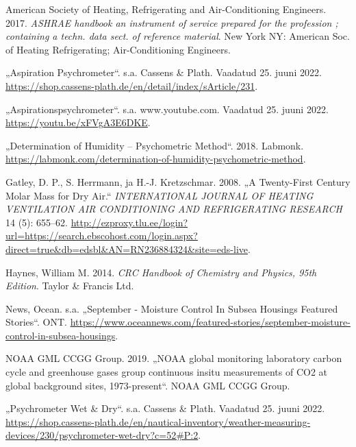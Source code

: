 \documentclass[
  12pt,
  a4paper,
  onecolumn, twoside]{article}
\newlength{\cslhangindent}
\newlength{\cslentryspacingunit} %
\newenvironment{CSLReferences}[2] %
 {%
  \setlength{\parindent}{0pt}
  \ifodd #1
  \let\oldpar\par
  \def\par{\hangindent=\cslhangindent\oldpar}
  \fi
  \setlength{\parskip}{#2\cslentryspacingunit}
 }%
 {}
\begin{document}
\hypertarget{refs}{}
\begin{CSLReferences}{1}{0}
\leavevmode{}%
American Society of Heating, Refrigerating and Air-Conditioning Engineers. 2017. \emph{{ASHRAE} handbook an instrument of service prepared for the profession ; containing a techn. data sect. of reference material}. New York NY: American Soc. of Heating Refrigerating; Air-Conditioning Engineers.

\leavevmode{}%
{„Aspiration Psychrometer``}. s.a. Cassens \& Plath. Vaadatud 25. juuni 2022. \url{https://shop.cassens-plath.de/en/detail/index/sArticle/231}.

\leavevmode{}%
{„Aspirationspsychrometer``}. s.a. www.youtube.com. Vaadatud 25. juuni 2022. \url{https://youtu.be/xFVgA3E6DKE}.

\leavevmode{}%
{„Determination of Humidity -- Psychometric Method``}. 2018. Labmonk. \url{https://labmonk.com/determination-of-humidity-psychometric-method}.

\leavevmode{}%
Gatley, D. P., S. Herrmann, ja H.-J. Kretzschmar. 2008. {„A Twenty-First Century Molar Mass for Dry Air.``} \emph{INTERNATIONAL JOURNAL OF HEATING VENTILATION AIR CONDITIONING AND REFRIGERATING RESEARCH} 14 (5): 655--62. \url{http://ezproxy.tlu.ee/login?url=https://search.ebscohost.com/login.aspx?direct=true\&db=edsbl\&AN=RN236884324\&site=eds-live}.

\leavevmode{}%
Haynes, William M. 2014. \emph{CRC Handbook of Chemistry and Physics, 95th Edition}. Taylor \& Francis Ltd.

\leavevmode{}%
News, Ocean. s.a. {„September - Moisture Control In Subsea Housings \textbar{} Featured Stories``}. ONT. \url{https://www.oceannews.com/featured-stories/september-moisture-control-in-subsea-housings}.

\leavevmode{}%
NOAA GML CCGG Group. 2019. {„{NOAA} global monitoring laboratory carbon cycle and greenhouse gases group continuous insitu measurements of {CO2} at global background sites, 1973-present``}. NOAA GML CCGG Group.

\leavevmode{}%
{„Psychrometer Wet \& Dry``}. s.a. Cassens \& Plath. Vaadatud 25. juuni 2022. \url{https://shop.cassens-plath.de/en/nautical-inventory/weather-measuring-devices/230/psychrometer-wet-dry?c=52\#P:2}.


\end{CSLReferences}
\end{document}
